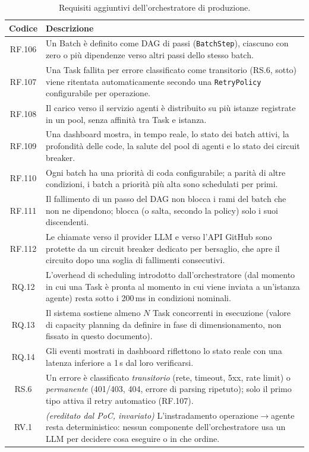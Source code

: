 \documentclass[11pt,a4paper]{article}
\begin{document}
\begin{table}[H]
\centering
\caption{Requisiti aggiuntivi dell'orchestratore di produzione.}
\label{tab:orch-requisiti}
\vspace{2mm}
\renewcommand{\arraystretch}{1.3}
\begin{tabularx}{\textwidth}{|c|X|}
\hline
\textbf{Codice} & \textbf{Descrizione} \\ \hline
RF.106 & Un Batch è definito come DAG di passi (\texttt{BatchStep}), ciascuno con zero o più dipendenze verso altri passi dello stesso batch. \\ \hline
RF.107 & Una Task fallita per errore classificato come transitorio (RS.6, sotto) viene ritentata automaticamente secondo una \texttt{RetryPolicy} configurabile per operazione. \\ \hline
RF.108 & Il carico verso il servizio agenti è distribuito su più istanze registrate in un pool, senza affinità tra Task e istanza. \\ \hline
RF.109 & Una dashboard mostra, in tempo reale, lo stato dei batch attivi, la profondità delle code, la salute del pool di agenti e lo stato dei circuit breaker. \\ \hline
RF.110 & Ogni batch ha una priorità di coda configurabile; a parità di altre condizioni, i batch a priorità più alta sono schedulati per primi. \\ \hline
RF.111 & Il fallimento di un passo del DAG non blocca i rami del batch che non ne dipendono; blocca (o salta, secondo la policy) solo i suoi discendenti. \\ \hline
RF.112 & Le chiamate verso il provider LLM e verso l'API GitHub sono protette da un circuit breaker dedicato per bersaglio, che apre il circuito dopo una soglia di fallimenti consecutivi. \\ \hline
RQ.12 & L'overhead di scheduling introdotto dall'orchestratore (dal momento in cui una Task è pronta al momento in cui viene inviata a un'istanza agente) resta sotto i 200\,ms in condizioni nominali. \\ \hline
RQ.13 & Il sistema sostiene almeno $N$ Task concorrenti in esecuzione (valore di capacity planning da definire in fase di dimensionamento, non fissato in questo documento). \\ \hline
RQ.14 & Gli eventi mostrati in dashboard riflettono lo stato reale con una latenza inferiore a 1\,s dal loro verificarsi. \\ \hline
RS.6 & Un errore è classificato \emph{transitorio} (rete, timeout, 5xx, rate limit) o \emph{permanente} (401/403, 404, errore di parsing ripetuto); solo il primo tipo attiva il retry automatico (RF.107). \\ \hline
RV.1 & \emph{(ereditato dal PoC, invariato)} L'instradamento operazione$\to$agente resta deterministico: nessun componente dell'orchestratore usa un LLM per decidere cosa eseguire o in che ordine. \\ \hline
\end{tabularx}
\end{table}
\end{document}
